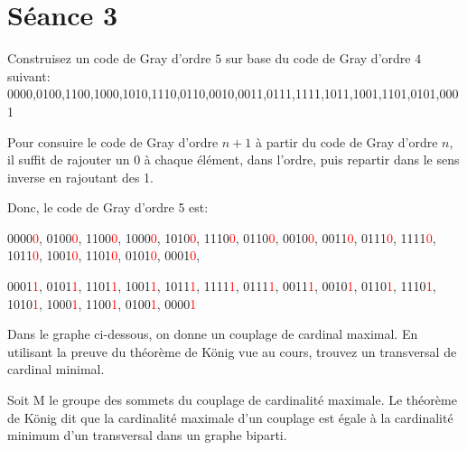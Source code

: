 
\section{Séance 3}

\vspace*{1cm}

\begin{exo}
Construisez un code de Gray d'ordre $5$ sur base du code de Gray d'ordre $4$ suivant: 0000,0100,1100,1000,1010,1110,0110,0010,0011,0111,1111,1011,1001,1101,0101,0001
\end{exo}

Pour consuire le code de Gray d'ordre $n+1$ à partir du code de Gray d'ordre $n$, il suffit de rajouter un 0 à chaque élément, dans l'ordre, puis repartir dans le sens inverse en rajoutant des 1.

Donc, le code de Gray d'ordre 5 est: 

0000\textcolor{red}{0}, 0100\textcolor{red}{0}, 1100\textcolor{red}{0}, 1000\textcolor{red}{0}, 1010\textcolor{red}{0}, 1110\textcolor{red}{0}, 0110\textcolor{red}{0}, 0010\textcolor{red}{0}, 0011\textcolor{red}{0}, 0111\textcolor{red}{0}, 1111\textcolor{red}{0}, 1011\textcolor{red}{0}, 1001\textcolor{red}{0}, 1101\textcolor{red}{0}, 0101\textcolor{red}{0}, 0001\textcolor{red}{0}, 

0001\textcolor{red}{1}, 0101\textcolor{red}{1}, 1101\textcolor{red}{1}, 1001\textcolor{red}{1}, 1011\textcolor{red}{1}, 1111\textcolor{red}{1}, 0111\textcolor{red}{1}, 0011\textcolor{red}{1}, 0010\textcolor{red}{1}, 0110\textcolor{red}{1}, 1110\textcolor{red}{1}, 1010\textcolor{red}{1}, 1000\textcolor{red}{1}, 1100\textcolor{red}{1}, 0100\textcolor{red}{1}, 0000\textcolor{red}{1}

\begin{exo}
Dans le graphe ci-dessous, on donne un couplage de cardinal maximal. En utilisant la preuve du th\'eor\`eme de K\"onig vue au cours, trouvez un transversal de cardinal minimal.
\end{exo}

\begin{figure}[!h]
\begin{center}

\end{center}
\caption{}
\end{figure}

Soit M le groupe des sommets du couplage de cardinalité maximale. Le théorème de König dit que la cardinalité maximale d'un couplage est égale à la cardinalité minimum d'un transversal dans un graphe biparti. 

